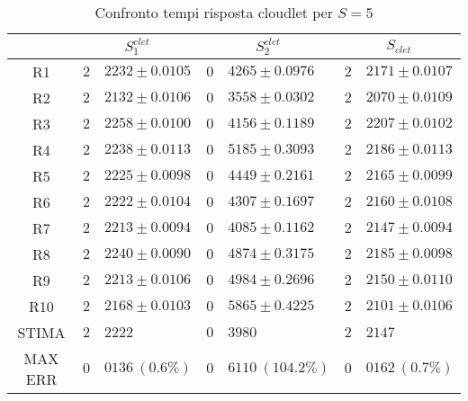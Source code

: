 \begin{table}[!h]
\begin{tabular}{c|r@{.}l|r@{.}l|r@{.}l}
& \multicolumn{2}{|c|}{$S_1^{clet}$}
& \multicolumn{2}{|c|}{$S_2^{clet}$}
& \multicolumn{2}{|c}{$S_{clet}$} 
\\          
\hline
R1      & $2$&$2232 \pm 0.0105$ & $0$&$4265 \pm 0.0976$  & $2$&$2171 \pm 0.0107$ \\
R2      & $2$&$2132 \pm 0.0106$ & $0$&$3558 \pm 0.0302$  & $2$&$2070 \pm 0.0109$ \\
R3      & $2$&$2258 \pm 0.0100$ & $0$&$4156 \pm 0.1189$  & $2$&$2207 \pm 0.0102$ \\
R4      & $2$&$2238 \pm 0.0113$ & $0$&$5185 \pm 0.3093$  & $2$&$2186 \pm 0.0113$ \\
R5      & $2$&$2225 \pm 0.0098$ & $0$&$4449 \pm 0.2161$  & $2$&$2165 \pm 0.0099$ \\
R6      & $2$&$2222 \pm 0.0104$ & $0$&$4307 \pm 0.1697$  & $2$&$2160 \pm 0.0108$ \\
R7      & $2$&$2213 \pm 0.0094$ & $0$&$4085 \pm 0.1162$  & $2$&$2147 \pm 0.0094$ \\
R8      & $2$&$2240 \pm 0.0090$ & $0$&$4874 \pm 0.3175$  & $2$&$2185 \pm 0.0098$ \\
R9      & $2$&$2213 \pm 0.0106$ & $0$&$4984 \pm 0.2696$  & $2$&$2150 \pm 0.0110$ \\
R10     & $2$&$2168 \pm 0.0103$ & $0$&$5865 \pm 0.4225$  & $2$&$2101 \pm 0.0106$ \\
STIMA   & $2$&$2222$            & $0$&$3980$             & $2$&$2147$            \\
MAX ERR & $0$&$0136 \ (0.6\%)$  & $0$&$6110 \ (104.2\%)$ & $0$&$0162 \ (0.7\%)$    
\end{tabular}
\centering
\caption{Confronto tempi risposta cloudlet per $S=5$}
\label{tab:5_sclet}
\end{table}
